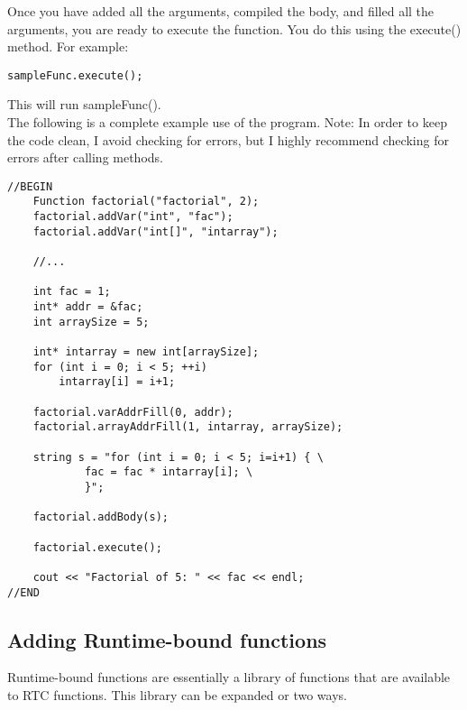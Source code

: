 \documentclass{article}
\begin{document}
\noindent
Once you have added all the arguments, compiled the body, and filled all the
arguments, you are ready to execute the function. You do this using the
execute() method. For example:
{\ttfamily \begin{verbatim}
sampleFunc.execute();
\end{verbatim} }
\noindent
This will run sampleFunc(). \\

\noindent
The following is a complete example use of the program.
Note: In order to keep the code clean, I avoid checking for errors, but I
highly recommend checking for errors after calling methods.
{\ttfamily \begin{verbatim}
//BEGIN
	Function factorial("factorial", 2);
	factorial.addVar("int", "fac");
	factorial.addVar("int[]", "intarray");

	//...

	int fac = 1;
	int* addr = &fac;
	int arraySize = 5;

	int* intarray = new int[arraySize];
	for (int i = 0; i < 5; ++i)
	    intarray[i] = i+1;

	factorial.varAddrFill(0, addr);
	factorial.arrayAddrFill(1, intarray, arraySize);

	string s = "for (int i = 0; i < 5; i=i+1) { \
		 	fac = fac * intarray[i]; \
		    }";

	factorial.addBody(s);

	factorial.execute();

	cout << "Factorial of 5: " << fac << endl;
//END
\end{verbatim} }





\subsection{Adding Runtime-bound functions}

Runtime-bound functions are essentially a library of functions that are
available to RTC functions. This library can be expanded or two ways. \\
\end{document}
